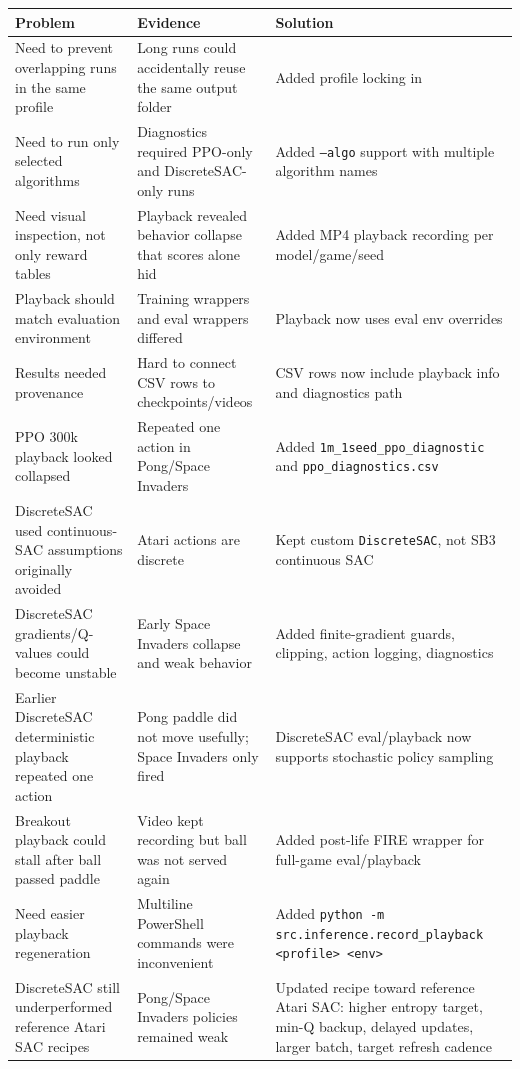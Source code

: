 \documentclass[11pt]{article}
\begin{document}
\begin{longtable}{L{0.29\textwidth} L{0.29\textwidth} L{0.32\textwidth}}
\toprule
Problem & Evidence & Solution \\
\midrule
\endhead
Need to prevent overlapping runs in the same profile & Long runs could accidentally reuse the same output folder & Added profile locking in  \\
Need to run only selected algorithms & Diagnostics required PPO-only and DiscreteSAC-only runs & Added \texttt{--algo} support with multiple algorithm names \\
Need visual inspection, not only reward tables & Playback revealed behavior collapse that scores alone hid & Added MP4 playback recording per model/game/seed \\
Playback should match evaluation environment & Training wrappers and eval wrappers differed & Playback now uses eval env overrides \\
Results needed provenance & Hard to connect CSV rows to checkpoints/videos & CSV rows now include playback info and diagnostics path \\
PPO 300k playback looked collapsed & Repeated one action in Pong/Space Invaders & Added \texttt{1m\_1seed\_ppo\_diagnostic} and \texttt{ppo\_diagnostics.csv} \\
DiscreteSAC used continuous-SAC assumptions originally avoided & Atari actions are discrete & Kept custom \texttt{DiscreteSAC}, not SB3 continuous SAC \\
DiscreteSAC gradients/Q-values could become unstable & Early Space Invaders collapse and weak behavior & Added finite-gradient guards, clipping, action logging, diagnostics \\
Earlier DiscreteSAC deterministic playback repeated one action & Pong paddle did not move usefully; Space Invaders only fired & DiscreteSAC eval/playback now supports stochastic policy sampling \\
Breakout playback could stall after ball passed paddle & Video kept recording but ball was not served again & Added post-life FIRE wrapper for full-game eval/playback \\
Need easier playback regeneration & Multiline PowerShell commands were inconvenient & Added \texttt{python -m src.inference.record\_playback <profile> <env>} \\
DiscreteSAC still underperformed reference Atari SAC recipes & Pong/Space Invaders policies remained weak & Updated recipe toward reference Atari SAC: higher entropy target, min-Q backup, delayed updates, larger batch, target refresh cadence \\
\bottomrule
\end{longtable}
\end{document}
